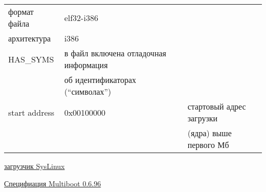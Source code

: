 \begin{tabular}{l l l}
формат файла & elf32-i386 \\
архитектура & i386 \\
HAS\_SYMS & в файл включена отладочная информация \\& об идентификаторах
(``символах'')\\
start address & 0x00100000 & стартовый адрес загрузки \\&&(ядра) выше первого
Мб\\
\end{tabular}



\href{http://www.syslinux.org/}{загрузчик SysLinux}

\href{http://www.gnu.org/software/grub/manual/multiboot/multiboot.html}{Специфиация
Multiboot 0.6.96}

\secdown




\secdown
{}
\secup

\secup

\secup
